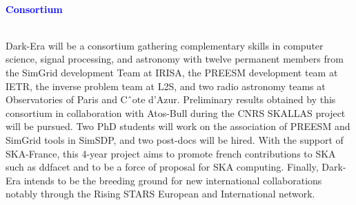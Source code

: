 \documentclass{beamer}
\renewenvironment{block}[1]{%
\begin{Sbox}%
\begin{minipage}[t]{\textwidth}
~\\
\textcolor{blue}{\quad #1}~\\
~\\%
\vspace{0.5cm}
} 
{%
\end{minipage}
\end{Sbox}\Ovalbox{\TheSbox}%
}
\begin{document}
{\begin{columns}[t]
\begin{column}{.49\linewidth}
\begin{block}{\large \textbf{Consortium}}
 \begin{minipage}{0.95\textwidth}
 Dark-Era will be a consortium gathering complementary skills in computer science, signal processing, and astronomy with twelve permanent members from the SimGrid development Team at IRISA, the PREESM development team at IETR, the inverse problem team at L2S, and two radio astronomy teams at Observatories of Paris and Cˆote d’Azur. Preliminary results obtained by this consortium in collaboration with Atos-Bull during the CNRS SKALLAS project will be pursued. Two PhD students will work on the association of PREESM and SimGrid tools in SimSDP, and two post-docs will be hired. With the support of SKA-France, this 4-year project aims to promote french contributions to SKA such as ddfacet and to be a force of proposal for SKA computing. Finally, Dark-Era intends to be the breeding ground for new international collaborations notably through the Rising STARS European and International network.
 \end{minipage}

 
\end{block}





\end{column}
\end{columns}

}
\end{document}
